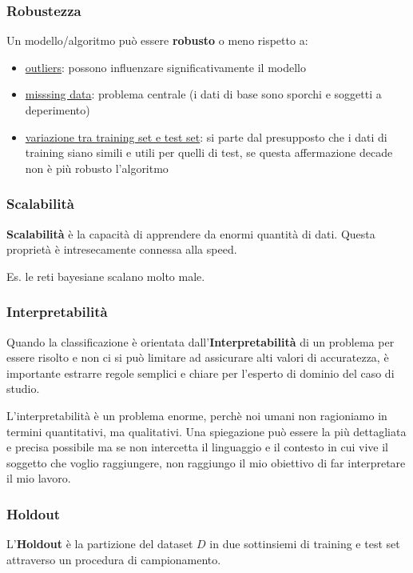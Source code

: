 \subsubsection{Robustezza}
\begin{defn}
	Un modello/algoritmo può essere \textbf{robusto} o meno rispetto a:
\begin{itemize}
	\item \underline{outliers}: possono influenzare significativamente il modello
	\item \underline{misssing data}: problema centrale (i dati di base sono sporchi e soggetti a deperimento)
	\item \underline{variazione tra training set e test set}: si parte dal presupposto che i dati di training siano simili e utili per quelli di test, se questa affermazione decade non \`e pi\`u robusto l'algoritmo
\end{itemize}
\subsubsection{Scalabilità}
\end{defn}

\begin{defn}
	\textbf{Scalabilit\`a} \`e la capacit\`a di apprendere da enormi quantit\`a di dati. Questa proprietà è intresecamente connessa alla speed. 
\end{defn}
Es. le reti bayesiane scalano molto male. 
\subsubsection{Interpretabilità}
\begin{defn}
Quando la classificazione è orientata dall'\textbf{Interpretabilit\`a} di un problema per essere risolto e non ci si può limitare ad assicurare alti valori di accuratezza, è importante estrarre regole semplici e chiare per l'esperto di dominio del caso di studio.
\end{defn}
L'interpretabilit\`a \`e un problema enorme, perch\`e noi umani non ragioniamo in termini quantitativi, ma qualitativi. Una spiegazione pu\`o essere la pi\`u dettagliata e precisa possibile ma se non intercetta il linguaggio e il contesto in cui vive il soggetto che voglio raggiungere, non raggiungo il mio obiettivo di far interpretare il mio lavoro.

\subsubsection{Holdout}
\begin{defn}
L'\textbf{Holdout} è la partizione del dataset $D$ in due sottinsiemi di training e test set attraverso un procedura di campionamento. 
\end{defn}

